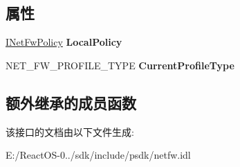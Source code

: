 \subsection*{属性}
\begin{DoxyCompactItemize}
\item 
\mbox{\label{interface_i_net_fw_mgr_ab0cf18d610dd33b2521b2bdd41098cd5}} 
\hyperlink{interface_i_net_fw_policy}{I\+Net\+Fw\+Policy} {\bfseries Local\+Policy}
\item 
\mbox{\label{interface_i_net_fw_mgr_a7710f9f1b4258f63bde5a62069433656}} 
N\+E\+T\+\_\+\+F\+W\+\_\+\+P\+R\+O\+F\+I\+L\+E\+\_\+\+T\+Y\+PE {\bfseries Current\+Profile\+Type}
\end{DoxyCompactItemize}
\subsection*{额外继承的成员函数}


该接口的文档由以下文件生成\+:\begin{DoxyCompactItemize}
\item 
E\+:/\+React\+O\+S-\/0../sdk/include/psdk/netfw.\+idl\end{DoxyCompactItemize}
